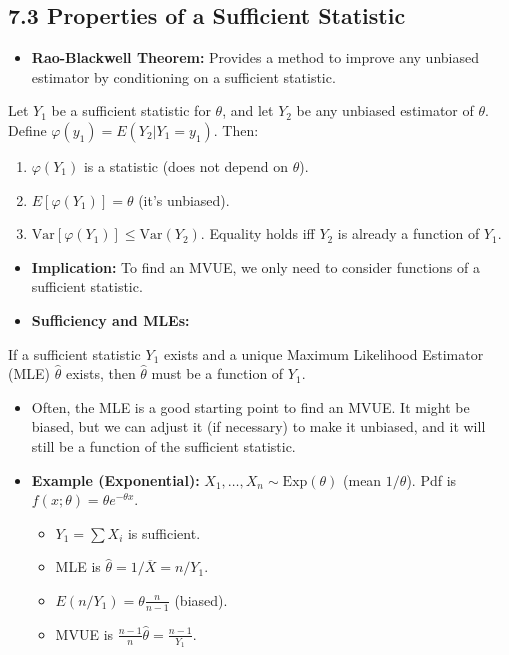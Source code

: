 \subsection{7.3 Properties of a Sufficient Statistic}

\begin{itemize}
	\item \textbf{Rao-Blackwell Theorem:} Provides a method to improve any unbiased estimator by conditioning on a sufficient statistic.
\end{itemize}

\begin{theorem}
Let $Y_1$ be a sufficient statistic for $\theta$, and let $Y_2$ be any unbiased estimator of $\theta$. Define $\varphi(y_1) = E(Y_2 | Y_1 = y_1)$. Then:
	\begin{enumerate}
		\item $\varphi(Y_1)$ is a statistic (does not depend on $\theta$).
		\item $E[\varphi(Y_1)] = \theta$ (it's unbiased).
		\item $\text{Var}[\varphi(Y_1)] \leq \text{Var}(Y_2)$. Equality holds iff $Y_2$ is already a function of $Y_1$.
	\end{enumerate}
\end{theorem}
\begin{itemize}
	\item \textbf{Implication:} To find an MVUE, we only need to consider functions of a sufficient statistic.
	\item \textbf{Sufficiency and MLEs:}
\end{itemize}

\begin{theorem}
If a sufficient statistic $Y_1$ exists and a unique Maximum Likelihood Estimator (MLE) $\widehat{\theta}$ exists, then $\widehat{\theta}$ must be a function of $Y_1$.
\end{theorem}
\begin{itemize}
	\item Often, the MLE is a good starting point to find an MVUE. It might be biased, but we can adjust it (if necessary) to make it unbiased, and it will still be a function of the sufficient statistic.
	\item \textbf{Example (Exponential):} $X_1, \dots, X_n \sim \text{Exp}(\theta)$ (mean $1/\theta$). Pdf is $f(x;\theta) = \theta e^{-\theta x}$.
	\begin{itemize}
		\item $Y_1 = \sum X_i$ is sufficient.
		\item MLE is $\widehat{\theta} = 1/\overline{X} = n/Y_1$.
		\item $E(n/Y_1) = \theta \frac{n}{n-1}$ (biased).
		\item MVUE is $\frac{n-1}{n} \widehat{\theta} = \frac{n-1}{Y_1}$.
	\end{itemize}
\end{itemize}

